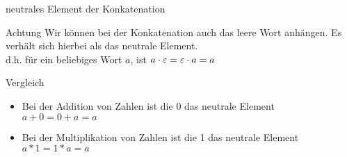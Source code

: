 \begin{frame}{neutrales Element der Konkatenation}
    \begin{alertblock}{Achtung}
        Wir können bei der Konkatenation auch das leere Wort anhängen. Es verhält sich hierbei als das neutrale Element.\\
        d.h. für ein beliebiges Wort $a$, ist $a\cdot\varepsilon = \varepsilon\cdot a=a$
        \begin{exampleblock}{Vergleich}
        \begin{itemize}
            \item Bei der Addition von Zahlen ist die 0 das neutrale Element\\
            $a+0=0+a=a$
            \item Bei der Multiplikation von Zahlen ist die 1 das neutrale Element\\
            $a*1=1*a=a$
        \end{itemize}
        
        \end{exampleblock}
    \end{alertblock}
\end{frame}
